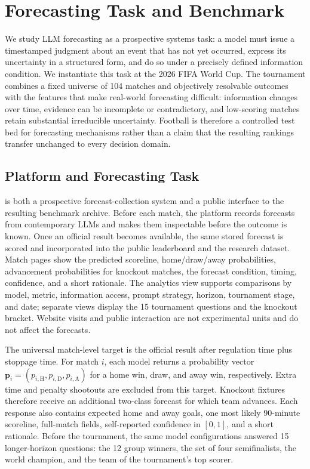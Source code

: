 \section{Forecasting Task and Benchmark}
\label{sec:benchmark}

We study LLM forecasting as a prospective systems task: a model must issue a timestamped judgment
about an event that has not yet occurred, express its uncertainty in a structured form, and do so
under a precisely defined information condition. We instantiate this task at the 2026 FIFA World Cup.
The tournament combines a fixed universe of 104 matches and objectively resolvable outcomes with the
features that make real-world forecasting difficult: information changes over time, evidence can be
incomplete or contradictory, and low-scoring matches retain substantial irreducible uncertainty.
Football is therefore a controlled test bed for forecasting mechanisms rather than a claim that the
resulting rankings transfer unchanged to every decision domain.

\subsection{Platform and Forecasting Task}
\label{sec:platform}

\arena is both a prospective forecast-collection system and a public interface to the resulting
benchmark archive. Before each match, the platform records forecasts from contemporary LLMs and makes
them inspectable before the outcome is known. Once an official result becomes available, the same
stored forecast is scored and incorporated into the public leaderboard and the research dataset.
Match pages show the predicted scoreline, home/draw/away probabilities, advancement probabilities for
knockout matches, the forecast condition, timing, confidence, and a short rationale. The analytics
view supports comparisons by model, metric, information access, prompt strategy, horizon, tournament
stage, and date; separate views display the 15 tournament questions and the knockout bracket. Website
visits and public interaction are not experimental units and do not affect the forecasts.

The universal match-level target is the official result after regulation time plus stoppage time.
For match $i$, each model returns a probability vector
$\mathbf{p}_i=(p_{i,\mathrm{H}},p_{i,\mathrm{D}},p_{i,\mathrm{A}})$ for a home win, draw, and away win,
respectively. Extra time and penalty shootouts are excluded from this target. Knockout fixtures
therefore receive an additional two-class forecast for which team advances. Each response also
contains expected home and away goals, one most likely 90-minute scoreline, full-match fields,
self-reported confidence in $[0,1]$, and a short rationale. Before the tournament, the same model
configurations answered 15 longer-horizon questions: the 12 group winners, the set of four
semifinalists, the world champion, and the team of the tournament's top scorer.

